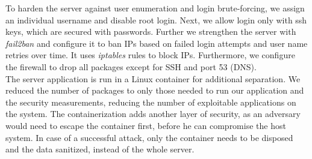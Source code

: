         To harden the server against user enumeration and login brute-forcing, we assign an individual username and disable root login. Next, we allow login only with ssh keys, which are secured with passwords.
        Further we strengthen the server with \textit{fail2ban} and configure it to ban IPs based on failed login attempts and user name retries over time. It uses \textit{iptables} rules to block IPs. Furthermore, we configure the firewall to drop all packages except for SSH and port 53 (DNS).\\
        
        The server application is run in a Linux container for additional separation. We reduced the number of packages to only those needed to run our application and the security measurements, reducing the number of exploitable applications on the system. The containerization adds another layer of security, as an adversary would need to escape the container first, before he can compromise the host system. In case of a successful attack, only the container needs to be disposed and the data sanitized, instead of the whole server.
        
